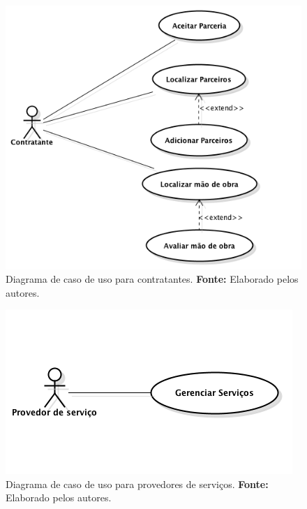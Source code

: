 \begin{figure}[h!]
	\centerline{\includegraphics[scale=0.6]{./imagens/caso-de-uso-contratantes.png}}
	\caption[Diagrama de caso de uso para contratantes]
	{Diagrama de caso de uso para contratantes. \textbf{Fonte:} Elaborado pelos autores.}
	\label{fig:caso_uso_contratantes_inicial}
\end{figure}

\newpage

\begin{figure}[h!]
	\centerline{\includegraphics[scale=0.6]{./imagens/caso-de-uso-provedores-servico.png}}
	\caption[Diagrama de caso de uso para provedores de serviços]
	{Diagrama de caso de uso para provedores de serviços. \textbf{Fonte:} Elaborado pelos autores.}
	\label{fig:caso_uso_provedor_servico_inicial}
\end{figure}


